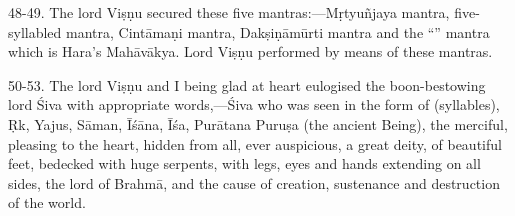 48-49. The lord Viṣṇu secured these five mantras:—Mṛtyuñjaya mantra,
five-syllabled mantra, Cintāmaṇi mantra, Dakṣiṇāmūrti mantra and the
“” mantra which is Hara’s Mahāvākya. Lord Viṣṇu performed
 by means of these mantras.

50-53. The lord Viṣṇu and I being glad at heart eulogised the boon-bestowing
lord Śiva with appropriate words,—Śiva who was seen in the form of  (syllables), Ṛk, Yajus, Sāman, Īśāna, Īśa, Purātana Puruṣa (the ancient
Being), the merciful, pleasing to the heart, hidden from all, ever auspicious,
a great deity, of beautiful feet, bedecked with huge serpents, with legs, eyes
and hands extending on all sides, the lord of Brahmā, and the cause of creation,
sustenance and destruction of the world.
